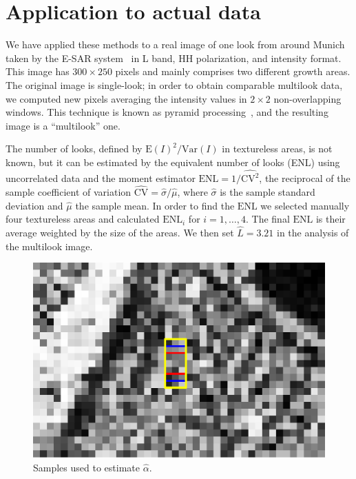 \documentclass[twocolumn]{svjour3}
\begin{document}

\section{Application to actual data}
\label{application}

We have applied these methods to a real image of one look from around Munich taken by the E-SAR system~\cite{Horn1996} in L band, HH polarization, and intensity format. 
This image has $300\times250$ pixels and mainly comprises two different growth areas. 
The original image is single-look; in order to obtain comparable multilook data, we computed new pixels averaging the intensity values in $2\times2$ non-overlapping windows. This technique is known as pyramid processing~\cite{Adelson1984}, and the resulting image is a ``multilook'' one.

The number of looks, defined by ${\text{E}(I)^2}/{\text{Var}(I)}$ in textureless areas, is not known, but it can be estimated by the equivalent number of looks (ENL) using uncorrelated data and the moment estimator
$\text{ENL}={1}/{\widehat{\text{CV}^2}}$, the reciprocal of the sample coefficient of variation $\widehat{\text{CV}}={\widehat{\sigma}}/{\widehat\mu}$, where $\widehat{\sigma}$ is the sample standard deviation and $\widehat\mu$ the sample mean.
In order to find the $\text{ENL}$ we selected manually four textureless areas and calculated $\text{ENL}_i$ for $i=1, \ldots, 4$. 
The final $\text{ENL}$ is their average weighted by the size of the areas. 
We then set $\widehat L=3.21$ in the analysis of the multilook image.

%	
\begin{figure}[htb]
	\centering
	\includegraphics[width=0.8\linewidth]{../../../Figures/PaperTesis/TresMuestrasAgrandada.eps}
	\caption{\label{TresMuestras}\small Samples used to estimate $\widehat{\alpha}$.}
\end{figure}
\end{document}
